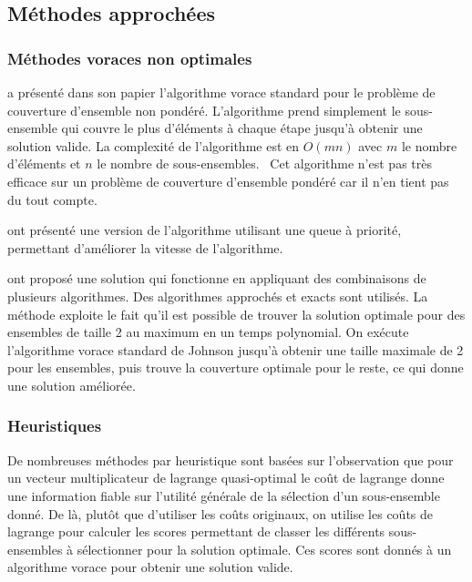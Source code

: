 \documentclass[12pt,letterpaper,twoside]{article}
\begin{document}
		\subsection{Méthodes approchées}
			\subsubsection{Méthodes voraces non optimales}\label{sec:soa-greedy}
				\citeauthor{Johnson:1973:AAC:800125.804034} a présenté dans son papier 
				l'algorithme vorace standard pour le problème de couverture d'ensemble non pondéré.
				L'algorithme prend simplement le sous-ensemble qui couvre le plus
				d'éléments à chaque étape jusqu'à obtenir une solution valide. La complexité de l'algorithme est en \(O(mn)\) avec \(m\)
				le nombre d'éléments et \(n\) le nombre de sous-ensembles.~\cite{Johnson:1973:AAC:800125.804034}
				Cet algorithme n'est pas très efficace sur un problème de couverture d'ensemble pondéré car il n'en tient pas du
				tout compte.

				\citeauthor{Cormen:2009:IAT:1614191} ont présenté une version de l'algorithme utilisant une queue à priorité,
				permettant d'améliorer la vitesse de l'algorithme.~\cite{Cormen:2009:IAT:1614191}

				\citeauthor{Goldschmidt:1993:MGH:177276.177287} ont proposé une solution qui fonctionne en appliquant des
				combinaisons de plusieurs algorithmes. Des algorithmes approchés et exacts sont utilisés.
				La méthode exploite le fait qu'il est possible de trouver la solution optimale pour des ensembles de taille 2 au maximum
				en un temps polynomial. On exécute l'algorithme vorace standard de Johnson jusqu'à obtenir une taille maximale de 2 pour les
				ensembles, puis trouve la couverture optimale pour le reste, ce qui donne une solution améliorée.~\cite{Goldschmidt:1993:MGH:177276.177287}
			\subsubsection{Heuristiques}
				De nombreuses méthodes par heuristique sont basées sur l'observation que pour un vecteur multiplicateur de lagrange quasi-optimal
				le coût de lagrange donne une information fiable sur l'utilité générale de la sélection d'un sous-ensemble donné.
				De là, plutôt que d'utiliser les coûts originaux, on utilise les coûts de lagrange pour calculer les scores permettant
				de classer les différents sous-ensembles à sélectionner pour la solution optimale. Ces scores sont donnés
				à un algorithme vorace pour obtenir une solution valide.~\cite{caprara2000algorithms}
\end{document}
